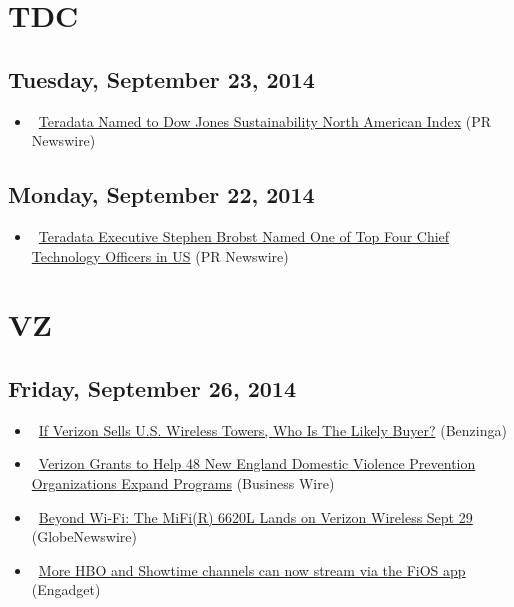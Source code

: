 \documentclass[11pt,asymmetric]{article}
\begin{document}
\section*{TDC}

\subsection*{Tuesday, September 23, 2014}
\begin{itemize}
\item\ \href{http://finance.yahoo.com/news/teradata-named-dow-jones-sustainability-150000584.html}{Teradata Named to Dow Jones Sustainability North American Index} (PR Newswire)
\end{itemize}
\subsection*{Monday, September 22, 2014}
\begin{itemize}
\item\ \href{http://finance.yahoo.com/news/teradata-executive-stephen-brobst-named-140000707.html}{Teradata Executive Stephen Brobst Named One of Top Four Chief Technology Officers in US} (PR Newswire)
\end{itemize}

\section*{VZ}

\subsection*{Friday, September 26, 2014}
\begin{itemize}
\item\ \href{http://finance.yahoo.com/news/verizon-sells-u-wireless-towers-142931852.html}{If Verizon Sells U.S. Wireless Towers, Who Is The Likely Buyer?} (Benzinga)
\item\ \href{http://finance.yahoo.com/news/verizon-grants-help-48-england-132400564.html}{Verizon Grants to Help 48 New England Domestic Violence Prevention Organizations Expand Programs} (Business Wire)
\item\ \href{http://finance.yahoo.com/news/beyond-wi-fi-mifi-r-120000548.html}{Beyond Wi-Fi: The MiFi(R) 6620L Lands on Verizon Wireless Sept 29} (GlobeNewswire)
\item\ \href{http://www.engadget.com/2014/09/26/fios-app-ten-new-channels/?ncid=rss_truncated}{More HBO and Showtime channels can now stream via the FiOS app} (Engadget)
\end{itemize}
\end{document}
